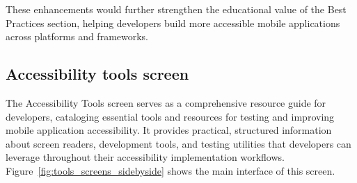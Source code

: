 These enhancements would further strengthen the educational value of the Best Practices section, helping developers build more accessible mobile applications across platforms and frameworks.

\subsection{Accessibility tools screen}
\label{subsec:tools-screen}

The Accessibility Tools screen serves as a comprehensive resource guide for developers, cataloging essential tools and resources for testing and improving mobile application accessibility. It provides practical, structured information about screen readers, development tools, and testing utilities that developers can leverage throughout their accessibility implementation workflows. Figure~\ref{fig:tools_screens_sidebyside} shows the main interface of this screen.

